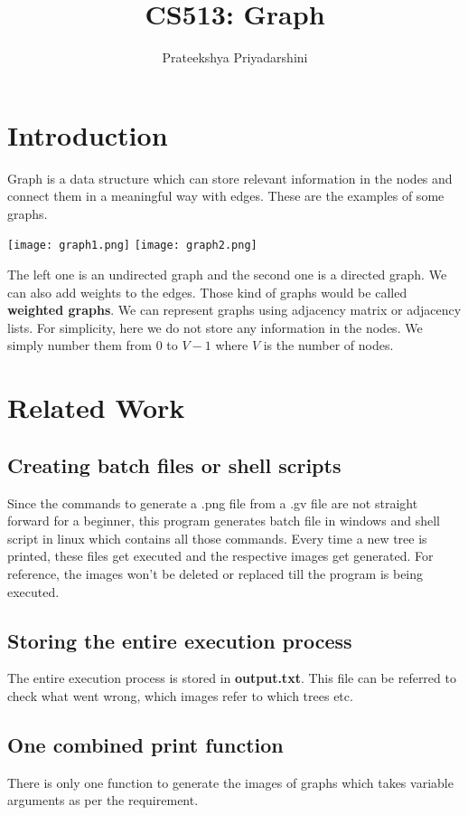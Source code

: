 \documentclass{article}
\title{CS513: Graph}
\date{}
\author{Prateekshya Priyadarshini}
\affil{M.Tech CSE}
\begin{document}
\tableofcontents
\newpage
{}
\maketitle

\section{Introduction}
Graph is a data structure which can store relevant information in the nodes and connect them in a meaningful way with edges. These are the examples of some graphs.
\begin{center}
\texttt{[image: graph1.png]}
\texttt{[image: graph2.png]}
\end{center}
The left one is an undirected graph and the second one is a directed graph. We can also add weights to the edges. Those kind of graphs would be called \textbf{weighted graphs}. We can represent graphs using adjacency matrix or adjacency lists.\newline
For simplicity, here we do not store any information in the nodes. We simply number them from $0$ to $V-1$ where $V$ is the number of nodes.


\section{Related Work}
\subsection{Creating batch files or shell scripts}
Since the commands to generate a .png file from a .gv file are not straight forward for a beginner, this program generates batch file in windows and shell script in linux which contains all those commands. Every time a new tree is printed, these files get executed and the respective images get generated. For reference, the images won't be deleted or replaced till the program is being executed.
\subsection{Storing the entire execution process}
The entire execution process is stored in \textbf{output.txt}. This file can be referred to check what went wrong, which images refer to which trees etc.
\subsection{One combined print function}
There is only one function to generate the images of graphs which takes variable arguments as per the requirement.
\end{document}
